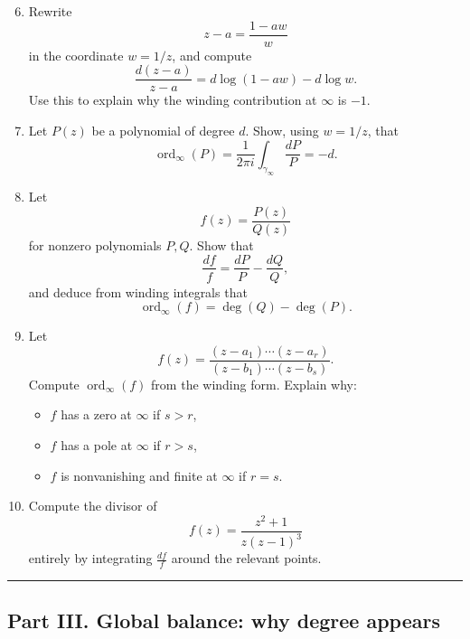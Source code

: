 \documentclass[11pt]{article}
\begin{document}
	\begin{enumerate}
		\setcounter{enumi}{5}
		
		\item Rewrite
		\[
		z-a=\frac{1-aw}{w}
		\]
		in the coordinate \(w=1/z\), and compute
		\[
		\frac{d(z-a)}{z-a}=d\log(1-aw)-d\log w.
		\]
		Use this to explain why the winding contribution at \(\infty\) is \(-1\).
		
		\item Let \(P(z)\) be a polynomial of degree \(d\). Show, using \(w=1/z\), that
		\[
		\operatorname{ord}_\infty(P)
		=
		\frac{1}{2\pi i}\int_{\gamma_\infty}\frac{dP}{P}
		=-d.
		\]
		
		\item Let
		\[
		f(z)=\frac{P(z)}{Q(z)}
		\]
		for nonzero polynomials \(P,Q\). Show that
		\[
		\frac{df}{f}=\frac{dP}{P}-\frac{dQ}{Q},
		\]
		and deduce from winding integrals that
		\[
		\operatorname{ord}_\infty(f)=\deg(Q)-\deg(P).
		\]
		
		\item Let
		\[
		f(z)=\frac{(z-a_1)\cdots (z-a_r)}{(z-b_1)\cdots (z-b_s)}.
		\]
		Compute \(\operatorname{ord}_\infty(f)\) from the winding form. Explain why:
		\begin{itemize}
			\item \(f\) has a zero at \(\infty\) if \(s>r\),
			\item \(f\) has a pole at \(\infty\) if \(r>s\),
			\item \(f\) is nonvanishing and finite at \(\infty\) if \(r=s\).
		\end{itemize}
		
		\item Compute the divisor of
		\[
		f(z)=\frac{z^2+1}{z(z-1)^3}
		\]
		entirely by integrating \(\frac{df}{f}\) around the relevant points.
	\end{enumerate}
	
	\bigskip
	\hrule
	\bigskip
	
	\subsection*{Part III. Global balance: why degree appears}
	
\end{document}
